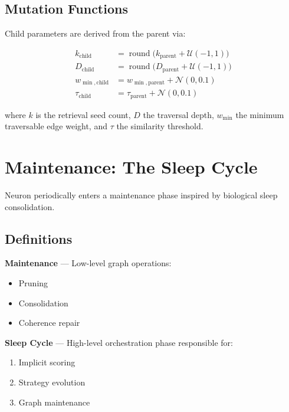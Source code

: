 \documentclass[11pt,a4paper]{article}
\begin{document}
\subsection{Mutation Functions}

Child parameters are derived from the parent via:

\begin{align}
    k_{\text{child}}      &= \operatorname{round}\!\bigl(
                               k_{\text{parent}} + \mathcal{U}(-1,1)\bigr) \\[4pt]
    D_{\text{child}}      &= \operatorname{round}\!\bigl(
                               D_{\text{parent}} + \mathcal{U}(-1,1)\bigr) \\[4pt]
    w_{\min,\text{child}} &= w_{\min,\text{parent}} + \mathcal{N}(0,0.1)   \\[4pt]
    \tau_{\text{child}}   &= \tau_{\text{parent}}   + \mathcal{N}(0,0.1)
\end{align}

where $k$ is the retrieval seed count, $D$ the traversal depth, $w_{\min}$ the
minimum traversable edge weight, and $\tau$ the similarity threshold.

\section{Maintenance: The Sleep Cycle}

Neuron periodically enters a maintenance phase inspired by biological sleep
consolidation.

\subsection{Definitions}

\begin{tcolorbox}[defbox]
    \textbf{Maintenance} — Low-level graph operations:
    \begin{itemize}
        \item Pruning
        \item Consolidation
        \item Coherence repair
    \end{itemize}

    \medskip

    \textbf{Sleep Cycle} — High-level orchestration phase responsible for:
    \begin{enumerate}
        \item Implicit scoring
        \item Strategy evolution
        \item Graph maintenance
    \end{enumerate}
\end{tcolorbox}
\end{document}
